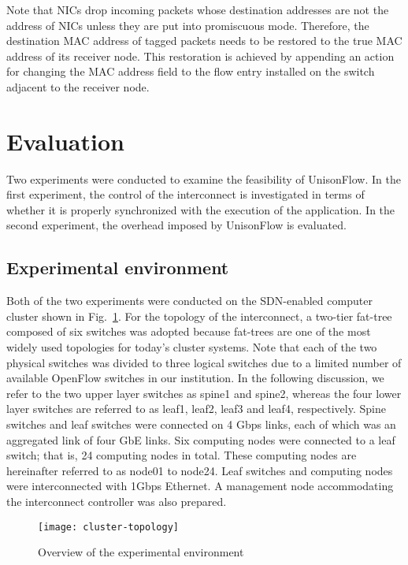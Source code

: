 Note that NICs drop incoming packets whose destination addresses are not
the address of NICs unless they are put into promiscuous mode.
Therefore, the destination MAC address of tagged packets needs to be
restored to the true MAC address of its receiver node. This restoration
is achieved by appending an action for changing the MAC address field to
the flow entry installed on the switch adjacent to the receiver node.

\section{Evaluation}\label{sec:iv-evaluation}

Two experiments were conducted to examine the feasibility of UnisonFlow.
In the first experiment, the control of the interconnect is investigated
in terms of whether it is properly synchronized with the execution of
the application. In the second experiment, the overhead imposed by
UnisonFlow is evaluated.

\subsection{Experimental environment}

Both of the two experiments were conducted on the SDN-enabled computer
cluster shown in Fig.~\ref{fig:cluster-topology}. For the topology of
the interconnect, a two-tier fat-tree composed of six switches was
adopted because fat-trees are one of the most widely used topologies for
today's cluster systems. Note that each of the two physical switches was
divided to three logical switches due to a limited number of available
OpenFlow switches in our institution. In the following discussion, we
refer to the two upper layer switches as spine1 and spine2, whereas the
four lower layer switches are referred to as leaf1, leaf2, leaf3 and
leaf4, respectively. Spine switches and leaf switches were connected on
4 Gbps links, each of which was an aggregated link of four GbE links.
Six computing nodes were connected to a leaf switch; that is, 24
computing nodes in total. These computing nodes are hereinafter referred
to as node01 to node24. Leaf switches and computing nodes were
interconnected with 1Gbps Ethernet. A management node accommodating the
interconnect controller was also prepared.

\begin{figure}
    \centering
    \texttt{[image: cluster-topology]}
    \caption{Overview of the experimental environment}%
    \label{fig:cluster-topology}
\end{figure}

